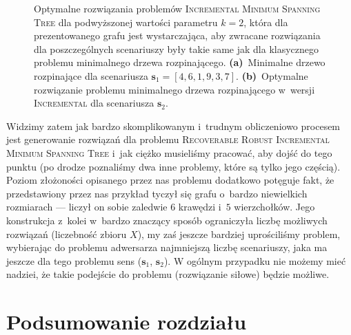 \begin{figure}[!h]
\begin{subfigure}[b]{0.3\textwidth}
		\caption{}
		\label{fig:robincrexampleopt:b}
	\end{subfigure}
	\hfill\null
	\caption{
		Optymalne rozwiązania problemów \textsc{Incremental Minimum Spanning Tree} dla podwyższonej wartości parametru $k = 2$, która dla prezentowanego grafu jest wystarczająca, aby zwracane rozwiązania dla poszczególnych scenariuszy były takie same jak dla klasycznego problemu minimalnego drzewa rozpinającego.
		\textbf{(a)}~Minimalne drzewo rozpinające dla scenariusza $\textbf{s}_{1} = \left[ 4, 6, 1, 9, 3, 7 \right]$.
		\textbf{(b)}~Optymalne rozwiązanie problemu minimalnego drzewa rozpinającego w~wersji \textsc{Incremental} dla scenariusza $\textbf{s}_{2}$.
	}
	\label{fig:robincrexampleopt}
\end{figure}

Widzimy zatem jak bardzo skomplikowanym i~trudnym obliczeniowo procesem jest generowanie rozwiązań dla problemu \textsc{Recoverable Robust Incremental Minimum Spanning Tree} i~jak ciężko musieliśmy pracować, aby dojść do tego punktu (po drodze poznaliśmy dwa inne problemy, które są tylko jego częścią).
Poziom złożoności opisanego przez nas problemu dodatkowo potęguje fakt, że przedstawiony przez nas przykład tyczył się grafu o~bardzo niewielkich rozmiarach --- liczył on sobie zaledwie $6$ krawędzi i~$5$ wierzchołków.
Jego konstrukcja z~kolei w~bardzo znaczący sposób ograniczyła liczbę możliwych rozwiązań (liczebność zbioru $X$), my zaś jeszcze bardziej uprościliśmy problem, wybierając do problemu adwersarza najmniejszą liczbę scenariuszy, jaka ma jeszcze dla tego problemu sens ($\textbf{s}_{1}$, $\textbf{s}_{2}$).
W ogólnym przypadku nie możemy mieć nadziei, że takie podejście do problemu (rozwiązanie siłowe) będzie możliwe.




\section{Podsumowanie rozdziału}




